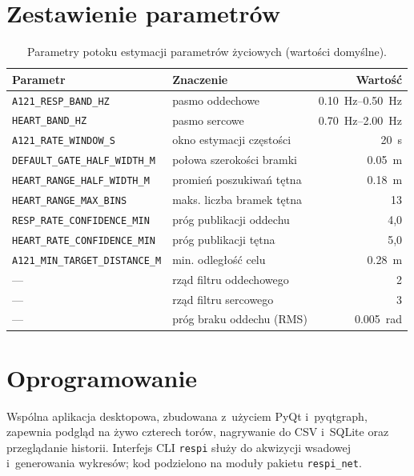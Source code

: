 \documentclass[12pt,a4paper,oneside]{report}
\begin{document}
\section{Zestawienie parametrów}
\begin{table}[H]
\centering
\caption[Parametry potoku przetwarzania]{Parametry potoku estymacji
parametrów życiowych (wartości domyślne).}
\label{tab:parametry-algo}
\small
\begin{tabular}{@{}llr@{}}
\toprule
\textbf{Parametr} & \textbf{Znaczenie} & \textbf{Wartość} \\
\midrule
\texttt{A121\_RESP\_BAND\_HZ}   & pasmo oddechowe        & \SIrange{0.10}{0.50}{Hz} \\
\texttt{HEART\_BAND\_HZ}        & pasmo sercowe          & \SIrange{0.70}{2.00}{Hz} \\
\texttt{A121\_RATE\_WINDOW\_S}  & okno estymacji częstości & \SI{20}{s} \\
\texttt{DEFAULT\_GATE\_HALF\_WIDTH\_M} & połowa szerokości bramki & \SI{0.05}{m} \\
\texttt{HEART\_RANGE\_HALF\_WIDTH\_M}  & promień poszukiwań tętna & \SI{0.18}{m} \\
\texttt{HEART\_RANGE\_MAX\_BINS}       & maks. liczba bramek tętna & 13 \\
\texttt{RESP\_RATE\_CONFIDENCE\_MIN}   & próg publikacji oddechu & 4{,}0 \\
\texttt{HEART\_RATE\_CONFIDENCE\_MIN}  & próg publikacji tętna   & 5{,}0 \\
\texttt{A121\_MIN\_TARGET\_DISTANCE\_M} & min. odległość celu    & \SI{0.28}{m} \\
--- & rząd filtru oddechowego & 2 \\
--- & rząd filtru sercowego   & 3 \\
--- & próg braku oddechu (RMS) & \SI{0.005}{rad} \\
\bottomrule
\end{tabular}
\end{table}

\section{Oprogramowanie}
Wspólna aplikacja desktopowa, zbudowana z~użyciem PyQt i~pyqtgraph, zapewnia
podgląd na żywo czterech torów, nagrywanie do CSV i~SQLite oraz przeglądanie
historii. Interfejs CLI \texttt{respi} służy do akwizycji wsadowej i~generowania
wykresów; kod podzielono na moduły pakietu \texttt{respi\_net}.
\end{document}
